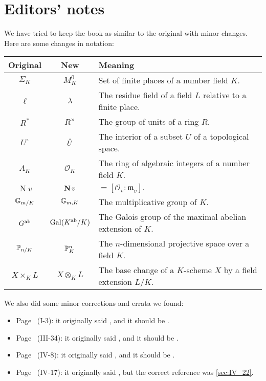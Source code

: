\chapter*{Editors' notes}
We have tried to keep the book as similar to the original with minor changes.
Here are some changes in notation:
\begin{longtable}{|c|c|p{9cm}|}
	\hline
	\textbf{Original} & \textbf{New} & \textbf{Meaning} \\
	\hline
	\endhead

	\hline
	\endfoot

	$\Sigma_K$ & $M_K^0$ & Set of finite places of a number field $K$. \\
	$\ell$ & $\lambda$ & The residue field of a field $L$ relative to a finite place. \\
	$R^*$ & $R^\times$ & The group of units of a ring $R$. \\
	$U^\circ$ & $\mathring{U}$ & The interior of a subset $U$ of a topological space. \\
	$A_K$ & $\mathcal{O}_K$ & The ring of algebraic integers of a number field $K$. \\
	$\operatorname{N} v$ & $\operatorname{\mathbf{N}} v$ & ${} = [\mathcal{O}_v : \mathfrak{m}_v].$ \\
	$\mathbb{G}_{m/K}$ & $\mathbb{G}_{m, K}$ & The multiplicative group of $K$. \\
	$G^{\mathrm{ab}}$ & $\operatorname{Gal}(K^{\mathrm{ab}}/K)$ & The Galois group of the maximal abelian extension of $K$. \\
	$\mathbb{P}_{n/K}$ & $\mathbb{P}^n_K$ & The $n$-dimensional projective space over a field $K$. \\
	$X \times_K L$ & $X \otimes_K L$ & The base change of a $K$-scheme $X$ by a field extension $L/K$. \\
\end{longtable}

We also did some minor corrections and errata we found:
\begin{itemize}
\item Page~\pageref{errata:t't} (I-3):
	it originally said , and it should be
	.
\item Page~\pageref{errata:An+k} (III-34):
	it originally said , and it should be
	.
\item Page~\pageref{errata:uv12} (IV-8):
	it originally said , and it
	should be .
\item Page~\pageref{errata:wrongsec} (IV-17):
	it originally said , but the
	correct reference was \ref{sec:IV_22}.
\end{itemize}
